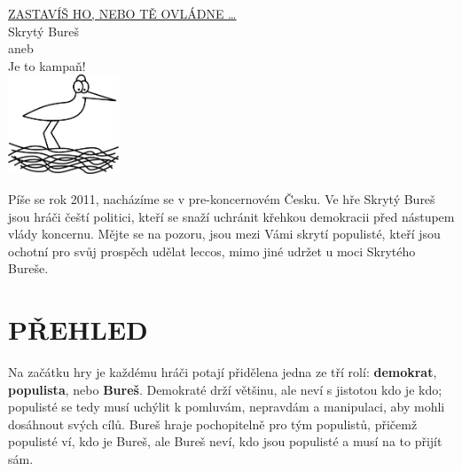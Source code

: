 \documentclass{article}
\begin{document}
\ttfamily

    \thispagestyle{empty}
    \begin{center}
        \selectfont
        \vspace*{2em}
        {\Large \uline{ZASTAVÍŠ HO, NEBO TĚ OVLÁDNE \ldots}\\}
        \vspace{16em}
        {\Huge Skrytý Bureš\\}
        \vspace{2em}
        {\large aneb}\\
        \vspace{1em}
        {\Large Je to kampaň!\\}
        \vspace{13em}
        \includegraphics[height=8em]{capi_hnizdo.pdf}
    \end{center}

    \newpage
    \twocolumn
    \normalfont %

    Píše se rok 2011, nacházíme se v pre-kon\-cer\-no\-vém Česku. Ve hře Skrytý Bureš jsou hráči čeští politici, kteří se snaží uchránit křehkou demokracii před nástupem vlády koncernu. Mějte se na pozoru, jsou mezi Vámi skrytí populisté, kteří jsou ochotní pro svůj prospěch udělat leccos, mimo jiné udržet u moci Skrytého Bureše.



    \section*{PŘEHLED}

    Na začátku hry je každému hráči potají při\-dě\-le\-na jedna ze tří rolí: {\bf demokrat}, {\bf populista}, nebo {\bf Bureš}.
    Demokraté drží většinu, ale neví s jistotou kdo je kdo; populisté se tedy musí uchýlit k pomluvám, nepravdám a manipulaci, aby mohli dosáhnout svých cílů. Bureš hraje pochopitelně pro tým populistů, přičemž populisté ví, kdo je Bureš, ale Bureš neví, kdo jsou populisté a musí na to přijít sám.
\end{document}
